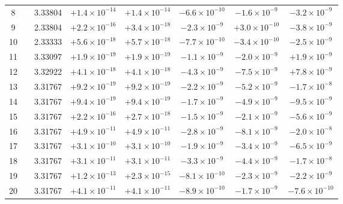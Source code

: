 \documentclass[aps,pra,twocolumn,superscriptaddress,longbibliography,floatfix]{revtex4-2}
\begin{document}
\begin{table}[!t]
\begin{ruledtabular}
\begin{tabular}{clrccccc}
     8 &              & 3.33804 & $+1.4\!\times\!10^{-14}$ & $+1.4\!\times\!10^{-14}$ & $-6.6\!\times\!10^{-10}$ & $-1.6\!\times\!10^{-9}$ & $-3.2\!\times\!10^{-9}$ \\
     9 &              & 2.33804 & $+2.2\!\times\!10^{-16}$ & $+3.4\!\times\!10^{-18}$ & $-2.3\!\times\!10^{-9}$ & $+3.0\!\times\!10^{-10}$ & $-3.8\!\times\!10^{-9}$ \\
    10 &              & 2.33333 & $+5.6\!\times\!10^{-18}$ & $+5.7\!\times\!10^{-18}$ & $-7.7\!\times\!10^{-10}$ & $-3.4\!\times\!10^{-10}$ & $-2.5\!\times\!10^{-9}$ \\
    11 &              & 3.33097 & $+1.9\!\times\!10^{-19}$ & $+1.9\!\times\!10^{-19}$ & $-1.1\!\times\!10^{-9}$ & $-2.0\!\times\!10^{-9}$ & $+1.9\!\times\!10^{-9}$ \\
    12 &              & 3.32922 & $+4.1\!\times\!10^{-18}$ & $+4.1\!\times\!10^{-18}$ & $-4.3\!\times\!10^{-9}$ & $-7.5\!\times\!10^{-9}$ & $+7.8\!\times\!10^{-9}$ \\
    13 &              & 3.31767 & $+9.2\!\times\!10^{-19}$ & $+9.2\!\times\!10^{-19}$ & $-2.2\!\times\!10^{-9}$ & $-5.2\!\times\!10^{-9}$ & $-1.7\!\times\!10^{-8}$ \\
    14 &              & 3.31767 & $+9.4\!\times\!10^{-19}$ & $+9.4\!\times\!10^{-19}$ & $-1.7\!\times\!10^{-9}$ & $-4.9\!\times\!10^{-9}$ & $-9.5\!\times\!10^{-9}$ \\
    15 &              & 3.31767 & $+2.2\!\times\!10^{-16}$ & $+2.7\!\times\!10^{-18}$ & $-1.5\!\times\!10^{-9}$ & $-2.1\!\times\!10^{-9}$ & $-5.6\!\times\!10^{-9}$ \\
    16 &              & 3.31767 & $+4.9\!\times\!10^{-11}$ & $+4.9\!\times\!10^{-11}$ & $-2.8\!\times\!10^{-9}$ & $-8.1\!\times\!10^{-9}$ & $-2.0\!\times\!10^{-8}$ \\
    17 &              & 3.31767 & $+3.1\!\times\!10^{-10}$ & $+3.1\!\times\!10^{-10}$ & $-1.9\!\times\!10^{-9}$ & $-3.4\!\times\!10^{-9}$ & $-6.5\!\times\!10^{-9}$ \\
    18 &              & 3.31767 & $+3.1\!\times\!10^{-11}$ & $+3.1\!\times\!10^{-11}$ & $-3.3\!\times\!10^{-9}$ & $-4.4\!\times\!10^{-9}$ & $-1.7\!\times\!10^{-8}$ \\
    19 &              & 3.31767 & $+1.2\!\times\!10^{-13}$ & $+2.3\!\times\!10^{-15}$ & $-8.1\!\times\!10^{-10}$ & $-2.3\!\times\!10^{-9}$ & $-2.2\!\times\!10^{-9}$ \\
    20 &              & 3.31767 & $+4.1\!\times\!10^{-11}$ & $+4.1\!\times\!10^{-11}$ & $-8.9\!\times\!10^{-10}$ & $-1.7\!\times\!10^{-9}$ & $-7.6\!\times\!10^{-10}$ \\
  \end{tabular}
  \end{ruledtabular}
\end{table}
\end{document}
